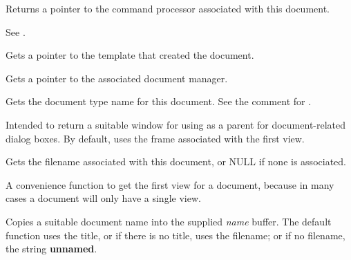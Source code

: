 Returns a pointer to the command processor associated with this document.

See .



Gets a pointer to the template that created the document.



Gets a pointer to the associated document manager.



Gets the document type name for this document. See the comment for .



Intended to return a suitable window for using as a parent for document-related
dialog boxes. By default, uses the frame associated with the first view.



Gets the filename associated with this document, or NULL if none is
associated.



A convenience function to get the first view for a document, because
in many cases a document will only have a single view.



Copies a suitable document name into the supplied {\it name} buffer. The default
function uses the title, or if there is no title, uses the filename; or if no
filename, the string {\bf unnamed}. 



